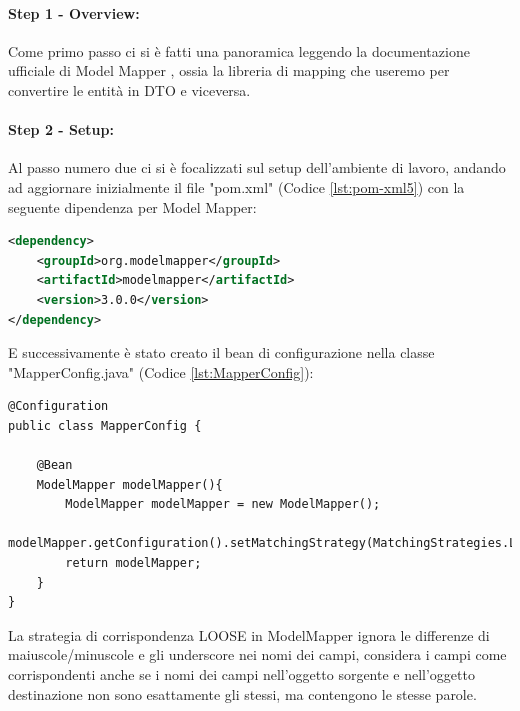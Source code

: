 \paragraph{Step 1 - Overview:}
Come primo passo ci si è fatti una panoramica leggendo la documentazione ufficiale di Model Mapper \cite{ModelMapperGettingStarted}, ossia la libreria di mapping che useremo per convertire le entità in DTO e viceversa.
\paragraph{Step 2 - Setup:}
Al passo numero due ci si è focalizzati sul setup dell’ambiente di lavoro, andando ad aggiornare inizialmente il file "pom.xml" (Codice \vref{lst:pom-xml5}) con la seguente dipendenza per Model Mapper:
\begin{lstlisting}[language=XML, caption={Aggiornamento dipendenze nel pom.xml per includere model-mapper}, label=lst:pom-xml5]
<dependency>
    <groupId>org.modelmapper</groupId>
    <artifactId>modelmapper</artifactId>
    <version>3.0.0</version>
</dependency>
\end{lstlisting}
E successivamente è stato creato il bean di configurazione nella classe "MapperConfig.java" (Codice \vref{lst:MapperConfig}):
\begin{lstlisting}[style=myJava, 
    caption={Classe di configurazione MapperConfig.java}, label=lst:MapperConfig, 
    emph={[2] LOOSE},
    emphstyle={[2]\color{codeDarkMagenta}},]
@Configuration
public class MapperConfig {

    @Bean
    ModelMapper modelMapper(){
        ModelMapper modelMapper = new ModelMapper();
        modelMapper.getConfiguration().setMatchingStrategy(MatchingStrategies.LOOSE);
        return modelMapper;
    }
}
\end{lstlisting}
La strategia di corrispondenza LOOSE in ModelMapper ignora le differenze di maiuscole/minuscole e gli underscore nei nomi dei campi, considera i campi come corrispondenti anche se i nomi dei campi nell’oggetto sorgente e nell’oggetto destinazione non sono esattamente gli stessi, ma contengono le stesse parole.
